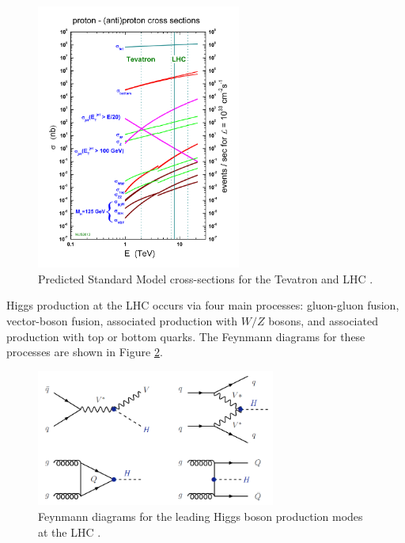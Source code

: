\begin{figure}[H]
        \centering
    \includegraphics[width=0.6\textwidth] {Pictures/crosssections.jpg}\hspace{1cm}
    \caption{Predicted Standard Model cross-sections for the Tevatron and LHC \cite{Stirling}.}
    \label{fig:crosssection}
\end{figure}

Higgs production at the LHC occurs via four main processes: gluon-gluon fusion, vector-boson fusion, associated production with $W/Z$ bosons, and associated production with top or bottom quarks. The Feynmann diagrams for these processes are shown in Figure \ref{fig:FeynmannHiggs}.  

\begin{figure}[H]
        \centering
    \includegraphics[width=0.7\textwidth] {Pictures/FeynmannHiggs.png}\hspace{1cm}
    \caption{Feynmann diagrams for the leading Higgs boson production modes at the LHC \cite{Djouadi}.}
    \label{fig:FeynmannHiggs}
\end{figure}

